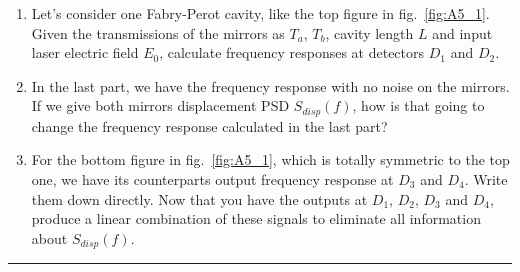 \documentclass[12pt,twoside]{article}
\begin{document}
\begin{enumerate}
\begin{enumerate}
%
%

    \item Let's consider one Fabry-Perot cavity, like the top figure in fig.~\ref{fig:A5_1}. Given the transmissions of the mirrors as $T_a$, $T_b$, cavity length $L$ and input laser electric field $E_0$, calculate frequency responses at detectors $D_1$ and $D_2$.

    \item In the last part, we have the frequency response with no noise on the mirrors. If we give both mirrors displacement PSD $S_{disp}(f)$, how is that going to change the frequency response calculated in the last part?

    \item For the bottom figure in fig.~\ref{fig:A5_1}, which is totally symmetric to the top one, we have its counterparts output frequency response at $D_3$ and $D_4$. Write them down directly. Now that you have the outputs at $D_1$, $D_2$, $D_3$ and $D_4$, produce a linear combination of these signals to eliminate all information about $S_{disp}(f)$.
\end{enumerate}

  \clearpage
  




\end{enumerate}



\bigskip
{\color{awesome} \hrule}
\end{document}
